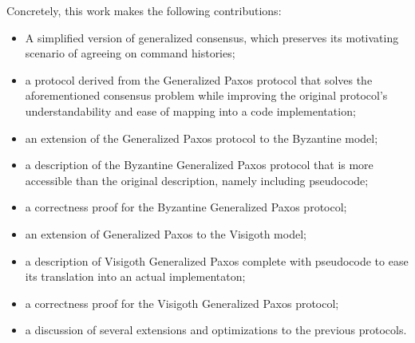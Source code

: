 \par
Concretely, this work makes the following contributions:
\begin{itemize}
	\item A simplified version of generalized consensus, which preserves its motivating scenario of agreeing on command histories;
	\item a protocol derived from the Generalized Paxos protocol that solves the aforementioned consensus problem while improving the original protocol's understandability and ease of mapping into a code implementation;
	\item an extension of the Generalized Paxos protocol to the Byzantine model;
	\item a description of the Byzantine Generalized Paxos protocol that is more accessible than the original description, namely including pseudocode;
	\item a correctness proof for the Byzantine Generalized Paxos protocol;
	\item an extension of Generalized Paxos to the Visigoth model;
	\item a description of Visigoth Generalized Paxos complete with pseudocode to ease its translation into an actual implementaton;
	\item a correctness proof for the Visigoth Generalized Paxos protocol;
	\item a discussion of several extensions and optimizations to the previous protocols.
\end{itemize}

